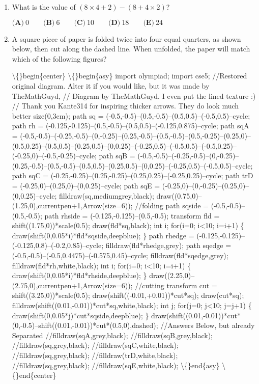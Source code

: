 \documentclass{article}
\begin{document}
\begin{enumerate}[label=\arabic*., itemsep=0.5em]\item What is the value of \((8 \times 4 + 2) - (8 + 4 \times 2)\)?

\(\textbf{(A)}\ 0 \qquad \textbf{(B)}\ 6 \qquad \textbf{(C)}\ 10 \qquad \textbf{(D)}\ 18 \qquad \textbf{(E)}\ 24\)\par \vspace{0.5em}\item A square piece of paper is folded twice into four equal quarters, as shown below, then cut along the dashed line. When unfolded, the paper will match which of the following figures?

\textbackslash\{\}begin\{center\}
\textbackslash\{\}begin\{asy\}
import olympiad;
import cse5;
//Restored original diagram. Alter it if you would like, but it was made by TheMathGuyd,
// Diagram by TheMathGuyd. I even put the lined texture :)
// Thank you Kante314 for inspiring thicker arrows. They do look much better
size(0,3cm);
path sq = (-0.5,-0.5)--(0.5,-0.5)--(0.5,0.5)--(-0.5,0.5)--cycle;
path rh = (-0.125,-0.125)--(0.5,-0.5)--(0.5,0.5)--(-0.125,0.875)--cycle;
path sqA = (-0.5,-0.5)--(-0.25,-0.5)--(0,-0.25)--(0.25,-0.5)--(0.5,-0.5)--(0.5,-0.25)--(0.25,0)--(0.5,0.25)--(0.5,0.5)--(0.25,0.5)--(0,0.25)--(-0.25,0.5)--(-0.5,0.5)--(-0.5,0.25)--(-0.25,0)--(-0.5,-0.25)--cycle;
path sqB = (-0.5,-0.5)--(-0.25,-0.5)--(0,-0.25)--(0.25,-0.5)--(0.5,-0.5)--(0.5,0.5)--(0.25,0.5)--(0,0.25)--(-0.25,0.5)--(-0.5,0.5)--cycle;
path sqC = (-0.25,-0.25)--(0.25,-0.25)--(0.25,0.25)--(-0.25,0.25)--cycle;
path trD = (-0.25,0)--(0.25,0)--(0,0.25)--cycle;
path sqE = (-0.25,0)--(0,-0.25)--(0.25,0)--(0,0.25)--cycle;
filldraw(sq,mediumgrey,black);
draw((0.75,0)--(1.25,0),currentpen+1,Arrow(size=6));
//folding
path sqside = (-0.5,-0.5)--(0.5,-0.5);
path rhside = (-0.125,-0.125)--(0.5,-0.5);
transform fld = shift((1.75,0))*scale(0.5);
draw(fld*sq,black);
int i;
for(i=0; i<10; i=i+1)
\{
  draw(shift(0,0.05*i)*fld*sqside,deepblue);
\}
path rhedge = (-0.125,-0.125)--(-0.125,0.8)--(-0.2,0.85)--cycle;
filldraw(fld*rhedge,grey);
path sqedge = (-0.5,-0.5)--(-0.5,0.4475)--(-0.575,0.45)--cycle;
filldraw(fld*sqedge,grey);
filldraw(fld*rh,white,black);
int i;
for(i=0; i<10; i=i+1)
\{
  draw(shift(0,0.05*i)*fld*rhside,deepblue);
\}
draw((2.25,0)--(2.75,0),currentpen+1,Arrow(size=6));
//cutting
transform cut = shift((3.25,0))*scale(0.5);
draw(shift((-0.01,+0.01))*cut*sq);
draw(cut*sq);
filldraw(shift((0.01,-0.01))*cut*sq,white,black);
int j;
for(j=0; j<10; j=j+1)
\{
draw(shift(0,0.05*j)*cut*sqside,deepblue);
\}
draw(shift((0.01,-0.01))*cut*(0,-0.5)--shift((0.01,-0.01))*cut*(0.5,0),dashed);
//Answers Below, but already Separated
//filldraw(sqA,grey,black);
//filldraw(sqB,grey,black);
//filldraw(sq,grey,black);
//filldraw(sqC,white,black);
//filldraw(sq,grey,black);
//filldraw(trD,white,black);
//filldraw(sq,grey,black);
//filldraw(sqE,white,black);
\textbackslash\{\}end\{asy\}
\textbackslash\{\}end\{center\}




\end{enumerate}
\end{document}
